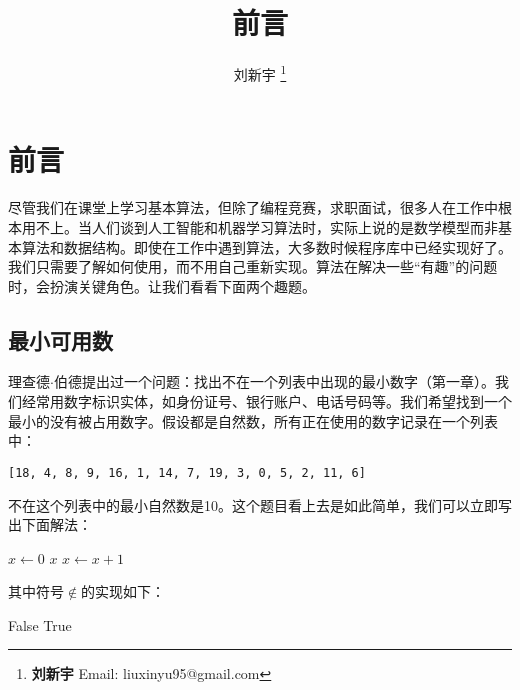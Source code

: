 \documentclass[b5paper]{ctexart}
\begin{document}
\title{前言}

\author{刘新宇
\thanks{{\bfseries 刘新宇} \newline
  Email: liuxinyu95@gmail.com \newline}
  }

\maketitle
\fi


\chapter*{前言}

尽管我们在课堂上学习基本算法，但除了编程竞赛，求职面试，很多人在工作中根本用不上。当人们谈到人工智能和机器学习算法时，实际上说的是数学模型而非基本算法和数据结构。即使在工作中遇到算法，大多数时候程序库中已经实现好了。我们只需要了解如何使用，而不用自己重新实现。算法在解决一些“有趣”的问题时，会扮演关键角色。让我们看看下面两个趣题。

\section*{最小可用数}
\label{min-free} 

理查德$\cdot$伯德提出过一个问题：找出不在一个列表中出现的最小数字（\cite{fp-pearls}第一章）。我们经常用数字标识实体，如身份证号、银行账户、电话号码等。我们希望找到一个最小的没有被占用数字。假设都是自然数，所有正在使用的数字记录在一个列表中：

\begin{Verbatim}[fontsize=\footnotesize]
[18, 4, 8, 9, 16, 1, 14, 7, 19, 3, 0, 5, 2, 11, 6]
\end{Verbatim}

不在这个列表中的最小自然数是10。这个题目看上去是如此简单，我们可以立即写出下面解法：

\begin{algorithmic}[1]
  \State $x \gets 0$
  \Loop
      \State \Return $x$
    \Else
      \State $x \gets x + 1$
    \EndIf
  \EndLoop
\EndFunction
\end{algorithmic}

其中符号$\notin$的实现如下：

\begin{algorithmic}[1]
      \State \Return False
    \EndIf
  \EndFor
  \State \Return True
\EndFunction
\end{algorithmic}
\end{document}
